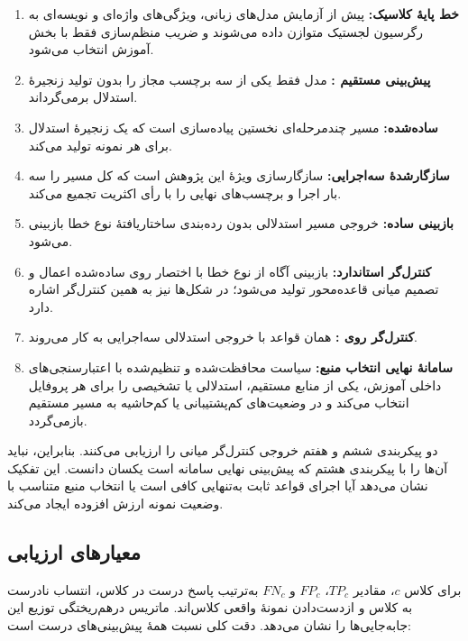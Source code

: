 \begin{enumerate}
    \item \textbf{خط پایۀ کلاسیک:} پیش از آزمایش مدل‌های زبانی، ویژگی‌های واژه‌ای و نویسه‌ای  به رگرسیون لجستیک متوازن داده می‌شوند و ضریب منظم‌سازی فقط با بخش آموزش انتخاب می‌شود.
    \item \textbf{پیش‌بینی مستقیم :} مدل فقط یکی از سه برچسب مجاز را بدون تولید زنجیرۀ استدلال برمی‌گرداند.
    \item \textbf{ ساده‌شده:} مسیر چندمرحله‌ای نخستین پیاده‌سازی است که یک زنجیرۀ استدلال برای هر نمونه تولید می‌کند.
    \item \textbf{ سازگارشدۀ سه‌اجرایی:} سازگارسازی ویژۀ این پژوهش است که کل مسیر را سه بار اجرا و برچسب‌های نهایی را با رأی اکثریت تجمیع می‌کند.
    \item \textbf{بازبینی ساده:} خروجی مسیر استدلالی بدون رده‌بندی ساختاریافتۀ نوع خطا بازبینی می‌شود.
    \item \textbf{کنترل‌گر استاندارد:} بازبینی آگاه از نوع خطا با اختصار  روی  ساده‌شده اعمال و تصمیم میانی قاعده‌محور تولید می‌شود؛  در شکل‌ها نیز به همین کنترل‌گر اشاره دارد.
    \item \textbf{کنترل‌گر روی :} همان قواعد با خروجی استدلالی سه‌اجرایی به کار می‌روند.
    \item \textbf{سامانۀ نهایی انتخاب منبع:} سیاست محافظت‌شده و تنظیم‌شده با اعتبارسنجی‌های داخلی آموزش، یکی از منابع مستقیم، استدلالی یا تشخیصی را برای هر پروفایل انتخاب می‌کند و در وضعیت‌های کم‌پشتیبانی یا کم‌حاشیه به مسیر مستقیم بازمی‌گردد.
\end{enumerate}

دو پیکربندی ششم و هفتم خروجی کنترل‌گر میانی را ارزیابی می‌کنند. بنابراین، نباید آن‌ها را با پیکربندی هشتم که پیش‌بینی نهایی سامانه است یکسان دانست. این تفکیک نشان می‌دهد آیا اجرای قواعد ثابت به‌تنهایی کافی است یا انتخاب منبع متناسب با وضعیت نمونه ارزش افزوده ایجاد می‌کند.

\subsection{معیارهای ارزیابی}

برای کلاس $c$، مقادیر $TP_c$، $FP_c$ و $FN_c$ به‌ترتیب پاسخ درست در کلاس، انتساب نادرست به کلاس و ازدست‌دادن نمونۀ واقعی کلاس‌اند. ماتریس درهم‌ریختگی توزیع این جابه‌جایی‌ها را نشان می‌دهد. دقت کلی نسبت همۀ پیش‌بینی‌های درست است:

